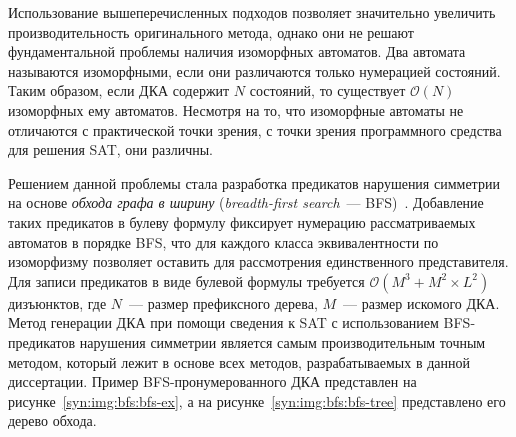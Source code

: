 Использование вышеперечисленных подходов позволяет значительно увеличить производительность оригинального метода, однако они не решают фундаментальной проблемы наличия изоморфных автоматов.
Два автомата называются изоморфными, если они различаются только нумерацией состояний.
Таким образом, если ДКА содержит $N$ состояний, то существует $\mathcal{O}\left(N\right)$ изоморфных ему автоматов.
Несмотря на то, что изоморфные автоматы не отличаются с практической точки зрения, с точки зрения программного средства для решения SAT, они различны.

Решением данной проблемы стала разработка предикатов нарушения симметрии на основе \emph{обхода графа в ширину} (\emph{breadth-first search}~--- BFS)~\cite{zakirzyanov2015LATA}.
Добавление таких предикатов в булеву формулу фиксирует нумерацию рассматриваемых автоматов в порядке BFS, что для каждого класса эквивалентности по изоморфизму позволяет оставить для рассмотрения единственного представителя.
Для записи предикатов в виде булевой формулы требуется $\mathcal{O}\left(M^{3} + M^{2} \times L^{2}\right)$ дизъюнктов, где $N$~--- размер префиксного дерева, $M$~--- размер искомого ДКА.
Метод генерации ДКА при помощи сведения к SAT с использованием BFS-предикатов нарушения симметрии является самым производительным точным методом, который лежит в основе всех методов, разрабатываемых в данной диссертации.
Пример BFS-пронумерованного ДКА представлен на рисунке~\ref{syn:img:bfs:bfs-ex}, а на рисунке~\ref{syn:img:bfs:bfs-tree} представлено его дерево обхода.

